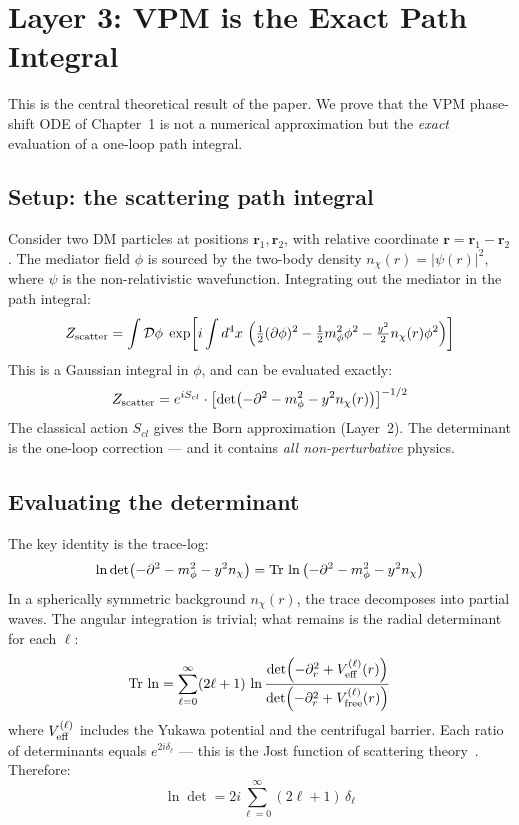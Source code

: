 \section{Layer 3: VPM is the Exact Path Integral}
\label{ch2:vpm_pi}

This is the central theoretical result of the paper. We prove that the
VPM phase-shift ODE of Chapter~1 is not a numerical approximation but
the \emph{exact} evaluation of a one-loop path integral.

\subsection{Setup: the scattering path integral}

Consider two DM particles at positions $\mathbf{r}_1, \mathbf{r}_2$,
with relative coordinate $\mathbf{r} = \mathbf{r}_1 - \mathbf{r}_2$.
The mediator field $\phi$ is sourced by the two-body density
$n_\chi(r) = |\psi(r)|^2$, where $\psi$ is the non-relativistic wavefunction.
Integrating out the mediator in the path integral:
\begin{equation}
  Z_{\rm scatter} = \int \mathcal{D}\phi\;
  \exp\!\left[i\int d^4x\,\left(\tfrac{1}{2}(\partial\phi)^2
  - \tfrac{1}{2}m_\phi^2\phi^2 - \tfrac{y^2}{2}n_\chi(r)\phi^2\right)\right]
\end{equation}
This is a Gaussian integral in $\phi$, and can be evaluated exactly:
\begin{equation}
  Z_{\rm scatter} = e^{iS_{cl}} \cdot
  \left[\det\!\left(-\partial^2 - m_\phi^2 - y^2 n_\chi(r)\right)\right]^{-1/2}
  \label{eq:Zscatter}
\end{equation}
The classical action $S_{cl}$ gives the Born approximation (Layer~2).
The determinant is the one-loop correction --- and it contains
\emph{all non-perturbative} physics.

\subsection{Evaluating the determinant}

The key identity is the trace-log:
\begin{equation}
  \ln\det\!\left(-\partial^2 - m_\phi^2 - y^2 n_\chi\right)
  = \mathrm{Tr}\,\ln\left(-\partial^2 - m_\phi^2 - y^2 n_\chi\right)
\end{equation}
In a spherically symmetric background $n_\chi(r)$, the trace decomposes
into partial waves. The angular integration is trivial;
what remains is the radial determinant for each $\ell$:
\begin{equation}
  \mathrm{Tr}\,\ln = \sum_{\ell=0}^{\infty}(2\ell+1)\,
  \ln\frac{\det(-\partial_r^2 + V_{\rm eff}^{(\ell)}(r))}{\det(-\partial_r^2 + V_{\rm free}^{(\ell)}(r))}
\end{equation}
where $V_{\rm eff}^{(\ell)}$ includes the Yukawa potential and the
centrifugal barrier. Each ratio of determinants equals $e^{2i\delta_\ell}$
--- this is the Jost function of scattering theory~\cite{Calucci1969,Newton1982}.
Therefore:
\begin{equation}
  \ln\det = 2i\sum_{\ell=0}^{\infty}(2\ell+1)\,\delta_\ell
\end{equation}

